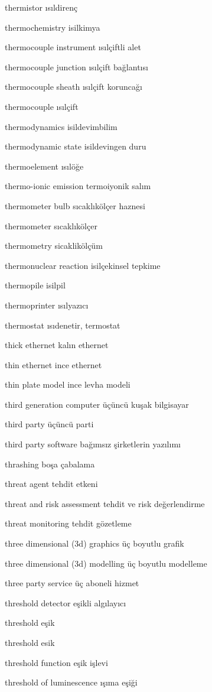 \documentclass[12pt,fleqn]{article}\usepackage{../../common}
\begin{document}
thermistor ısıldirenç

thermochemistry isilkimya

thermocouple instrument ısılçiftli alet

thermocouple junction ısılçift bağlantısı

thermocouple sheath ısılçift koruncağı

thermocouple ısılçift

thermodynamics isildevimbilim

thermodynamic state isildevingen duru

thermoelement ısılöğe

thermo-ionic emission termoiyonik salım

thermometer bulb sıcaklıkölçer haznesi

thermometer sıcaklıkölçer

thermometry sicaklikölçüm

thermonuclear reaction isilçekinsel tepkime

thermopile isilpil

thermoprinter ısılyazıcı

thermostat ısıdenetir, termostat

thick ethernet kalın ethernet

thin ethernet ince ethernet

thin plate model ince levha modeli

third generation computer üçüncü kuşak bilgisayar

third party üçüncü parti

third party software bağımsız şirketlerin yazılımı

thrashing boşa çabalama

threat agent tehdit etkeni

threat and risk assessment tehdit ve risk değerlendirme

threat monitoring tehdit gözetleme

three dimensional (3d) graphics üç boyutlu grafik

three dimensional (3d) modelling üç boyutlu modelleme

three party service üç aboneli hizmet

threshold detector eşikli algılayıcı

threshold eşik

threshold esik

threshold function eşik işlevi

threshold of luminescence ışıma eşiği
\end{document}

